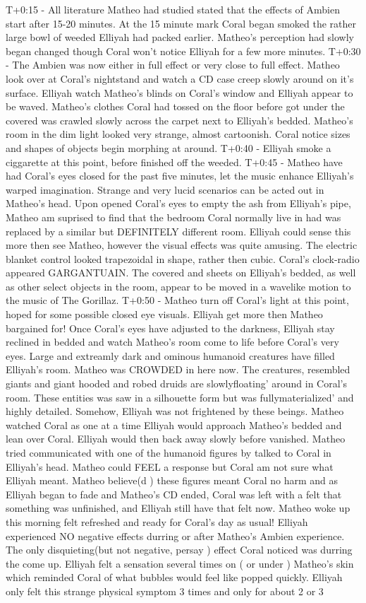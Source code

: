 \documentclass[12pt]{book}
\begin{document}
T+0:15 - All literature Matheo had studied stated that the effects of Ambien start after 15-20 minutes. At the 15 minute mark Coral began smoked the rather large bowl of weeded Elliyah had packed earlier. Matheo's perception had slowly began changed though Coral won't notice Elliyah for a few more minutes. T+0:30 - The Ambien was now either in full effect or very close to full effect. Matheo look over at Coral's nightstand and watch a CD case creep slowly around on it's surface. Elliyah watch Matheo's blinds on Coral's window and Elliyah appear to be waved. Matheo's clothes Coral had tossed on the floor before got under the covered was crawled slowly across the carpet next to Elliyah's bedded. Matheo's room in the dim light looked very strange, almost cartoonish. Coral notice sizes and shapes of objects begin morphing at around. T+0:40 - Elliyah smoke a ciggarette at this point, before finished off the weeded. T+0:45 - Matheo have had Coral's eyes closed for the past five minutes, let the music enhance Elliyah's warped imagination. Strange and very lucid scenarios can be acted out in Matheo's head. Upon opened Coral's eyes to empty the ash from Elliyah's pipe, Matheo am suprised to find that the bedroom Coral normally live in had was replaced by a similar but DEFINITELY different room. Elliyah could sense this more then see Matheo, however the visual effects was quite amusing. The electric blanket control looked trapezoidal in shape, rather then cubic. Coral's clock-radio appeared GARGANTUAIN. The covered and sheets on Elliyah's bedded, as well as other select objects in the room, appear to be moved in a wavelike motion to the music of The Gorillaz. T+0:50 - Matheo turn off Coral's light at this point, hoped for some possible closed eye visuals. Elliyah get more then Matheo bargained for! Once Coral's eyes have adjusted to the darkness, Elliyah stay reclined in bedded and watch Matheo's room come to life before Coral's very eyes. Large and extreamly dark and ominous humanoid creatures have filled Elliyah's room. Matheo was CROWDED in here now. The creatures, resembled giants and giant hooded and robed druids are slowlyfloating' around in Coral's room. These entities was saw in a silhouette form but was fullymaterialized' and highly detailed. Somehow, Elliyah was not frightened by these beings. Matheo watched Coral as one at a time Elliyah would approach Matheo's bedded and lean over Coral. Elliyah would then back away slowly before vanished. Matheo tried communicated with one of the humanoid figures by talked to Coral in Elliyah's head. Matheo could FEEL a response but Coral am not sure what Elliyah meant. Matheo believe(d ) these figures meant Coral no harm and as Elliyah began to fade and Matheo's CD ended, Coral was left with a felt that something was unfinished, and Elliyah still have that felt now. Matheo woke up this morning felt refreshed and ready for Coral's day as usual! Elliyah experienced NO negative effects durring or after Matheo's Ambien experience. The only disquieting(but not negative, persay ) effect Coral noticed was durring the come up. Elliyah felt a sensation several times on ( or under ) Matheo's skin which reminded Coral of what bubbles would feel like popped quickly. Elliyah only felt this strange physical symptom 3 times and only for about 2 or 3 
\end{document}
